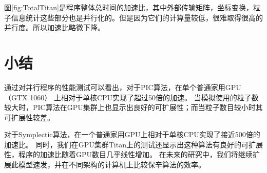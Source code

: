 图\ref{fig:TotalTitan}是程序整体总时间的加速比，其中外部传输矩阵，坐标变换，粒子信息统计这些部分也是并行化的。但是因为它们的计算量较低，很难取得很高的并行度。所以加速比略微下降。

\section{小结}                    \label{section:Performance_conclusion}
通过对并行程序的性能测试可以看出，对于PIC算法，在单个普通家用GPU （GTX 1060） 上相对于单核CPU实现了超过50倍的加速。
当模拟使用的粒子数较大时，PIC算法在GPU集群上也显示出良好的可扩展性；而当粒子数目较小时其可扩展性较差。

对于Symplectic算法，在一个普通家用GPU上相对于单核CPU实现了接近500倍的加速比。
同时，我们在GPU集群Titan上的测试还显示出这种算法有良好的可扩展性，程序的加速比随着GPU数目几乎线性增加。
在未来的研究中，我们将继续扩展此模型速发，并在不同架构的计算机上比较保辛算法的效率。